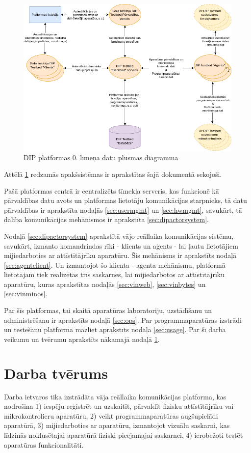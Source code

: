 \begin{figure}[H]
    \includegraphics[width=0.7\linewidth]{assets/DPD0.drawio.png}
    \centering
    \caption{DIP platformas 0. līmeņa datu plūsmas diagramma}
    \label{fig:dipdpd0}
\end{figure}

Attēlā \ref{fig:dipdpd0} redzamās apakšsistēmas ir aprakstītas šajā dokumentā
sekojoši. 

Pašā platformas centrā ir centralizēts tīmekļa serveris, kas funkcionē
kā pārvaldības datu avots un platformas lietotāju komunikācijas starpnieks, tā
datu pārvaldības ir aprakstīta nodaļās \ref{sec:usermgmt} un \ref{sec:hwmgmt},
savukārt, tā dalība komunikācijas mehānismos ir aprakstīta \ref{sec:dipactorsystem}.

Nodaļā \ref{sec:dipactorsystem} aprakstītā vājo reāllaika komunikācijas sistēmu,
savukārt, izmanto komandrindas rīki - klients un aģents - lai ļautu lietotājiem
mijiedarboties ar attīstītājrīku aparatūru. Šis mehānisms ir aprakstīts nodaļā
\ref{sec:agentclient}. Un izmantojot šo klienta - aģenta mehānismu, platformā
lietotājam tiek realizētas trīs saskarnes, lai mijiedarbotos ar attīstītājrīku
aparatūru, kuras aprakstītas nodaļās \ref{sec:vinweb}, \ref{sec:vinbytes} un
\ref{sec:vinminos}.

Par šīs platformas, tai skaitā aparatūras laboratoriju, uzstādīšanu un
administrēšanu ir aprakstīts nodaļā \ref{sec:ops}. Par programmaparatūras
izstrādi un testēšanu platformā mazliet aprakstīts nodaļā \ref{sec:usage}. Par
šī darba veikumu un tvērumu aprakstīts nākamajā nodaļā \ref{sec:scope}.

\section{Darba tvērums}
\label{sec:scope}

Darba ietvaros tika izstrādāta vāja reāllaika komunikācijas platforma, kas
nodrošina 1) iespēju reģistrēt un uzskaitīt, pārvaldīt fizisku attīstītājrīku
vai mikrokontrolieru aparatūru, 2) veikt programmaparatūras augšupielādi
aparatūrā, 3) mijiedarboties ar aparatūru, izmantojot vizuālu saskarni, kas
līdzinās noklusētajai aparatūrā fiziski pieejamajai saskarnei, 4) ierobežoti
testēt aparatūras funkcionalitāti.

